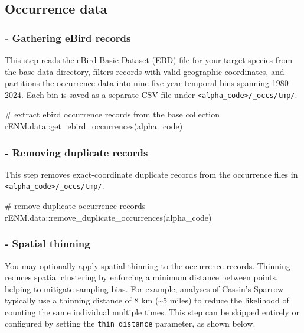 \documentclass[
  letterpaper,
  DIV=11,
  numbers=noendperiod]{scrartcl}
\newenvironment{Shaded}{\begin{snugshade}}{\end{snugshade}}
\newcommand{\CommentTok}[1]{\textcolor[rgb]{0.37,0.37,0.37}{#1}}
\newcommand{\FunctionTok}[1]{\textcolor[rgb]{0.28,0.35,0.67}{#1}}
\newcommand{\NormalTok}[1]{\textcolor[rgb]{0.00,0.23,0.31}{#1}}
\newcommand{\SpecialCharTok}[1]{\textcolor[rgb]{0.37,0.37,0.37}{#1}}
\begin{document}
\subsection{Occurrence data}\label{occurrence-data}

\subsubsection{- Gathering eBird records}\label{gathering-ebird-records}

This step reads the eBird Basic Dataset (EBD) file for your target
species from the base data directory, filters records with valid
geographic coordinates, and partitions the occurrence data into nine
five-year temporal bins spanning 1980--2024. Each bin is saved as a
separate CSV file under
\texttt{\textless{}alpha\_code\textgreater{}/\_occs/tmp/}.

\begin{Shaded}
\begin{Highlighting}[]
\CommentTok{\# extract ebird occurrence records from the base collection}
\NormalTok{rENM.data}\SpecialCharTok{::}\FunctionTok{get\_ebird\_occurrences}\NormalTok{(alpha\_code)}
\end{Highlighting}
\end{Shaded}

\subsubsection{- Removing duplicate
records}\label{removing-duplicate-records}

This step removes exact-coordinate duplicate records from the occurrence
files in \texttt{\textless{}alpha\_code\textgreater{}/\_occs/tmp/}.

\begin{Shaded}
\begin{Highlighting}[]
\CommentTok{\# remove duplicate occurrence records}
\NormalTok{rENM.data}\SpecialCharTok{::}\FunctionTok{remove\_duplicate\_occurrences}\NormalTok{(alpha\_code)}
\end{Highlighting}
\end{Shaded}

\subsubsection{- Spatial thinning}\label{spatial-thinning}

You may optionally apply spatial thinning to the occurrence records.
Thinning reduces spatial clustering by enforcing a minimum distance
between points, helping to mitigate sampling bias. For example, analyses
of Cassin's Sparrow typically use a thinning distance of 8 km
(\textasciitilde5 miles) to reduce the likelihood of counting the same
individual multiple times. This step can be skipped entirely or
configured by setting the \texttt{thin\_distance} parameter, as shown
below.
\end{document}
